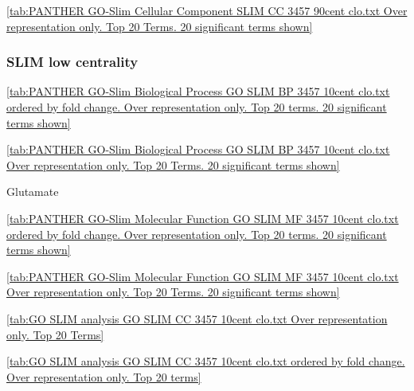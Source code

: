 \ref{tab:PANTHER GO-Slim Cellular Component SLIM CC 3457 90cent clo.txt Over representation only. Top 20 Terms. 20 significant terms shown}







\clearpage


\subsubsection{SLIM low centrality}

\ref{tab:PANTHER GO-Slim Biological Process GO SLIM BP 3457 10cent clo.txt ordered by fold change. Over representation only. Top 20 terms. 20 significant terms shown}

\ref{tab:PANTHER GO-Slim Biological Process GO SLIM BP 3457 10cent clo.txt Over representation only. Top 20 Terms. 20 significant terms shown}

Glutamate

\ref{tab:PANTHER GO-Slim Molecular Function GO SLIM MF 3457 10cent clo.txt ordered by fold change. Over representation only. Top 20 terms. 20 significant terms shown}

\ref{tab:PANTHER GO-Slim Molecular Function GO SLIM MF 3457 10cent clo.txt Over representation only. Top 20 Terms. 20 significant terms shown}

\ref{tab:GO SLIM analysis GO SLIM CC 3457 10cent clo.txt Over representation only. Top 20 Terms}

\ref{tab:GO SLIM analysis GO SLIM CC 3457 10cent clo.txt ordered by fold change. Over representation only. Top 20 terms}

